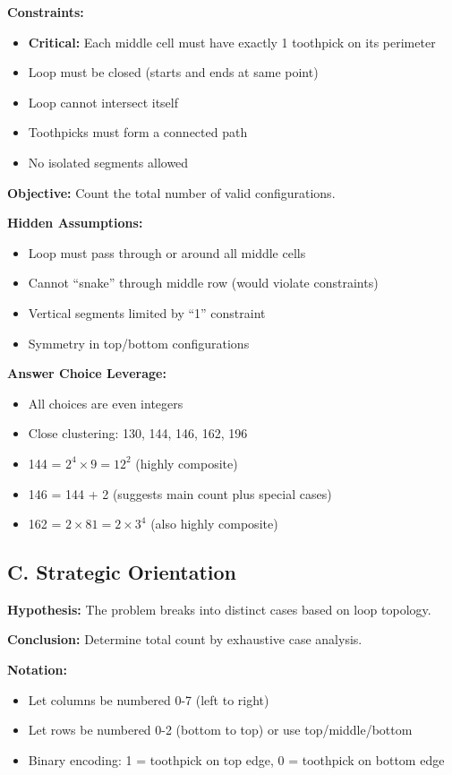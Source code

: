 \documentclass[12pt]{article}
\begin{document}
\begin{problemconfigbox}
\textbf{Constraints:}
\begin{itemize}
    \item \textbf{Critical:} Each middle cell must have exactly 1 toothpick on its perimeter
    \item Loop must be closed (starts and ends at same point)
    \item Loop cannot intersect itself
    \item Toothpicks must form a connected path
    \item No isolated segments allowed
\end{itemize}

\textbf{Objective:} Count the total number of valid configurations.

\textbf{Hidden Assumptions:}
\begin{itemize}
    \item Loop must pass through or around all middle cells
    \item Cannot ``snake'' through middle row (would violate constraints)
    \item Vertical segments limited by ``1'' constraint
    \item Symmetry in top/bottom configurations
\end{itemize}

\textbf{Answer Choice Leverage:}
\begin{itemize}
    \item All choices are even integers
    \item Close clustering: 130, 144, 146, 162, 196
    \item 144 = $2^4 \times 9 = 12^2$ (highly composite)
    \item 146 = 144 + 2 (suggests main count plus special cases)
    \item 162 = $2 \times 81 = 2 \times 3^4$ (also highly composite)
\end{itemize}

\subsection*{C. Strategic Orientation}

\textbf{Hypothesis:} The problem breaks into distinct cases based on loop topology.

\textbf{Conclusion:} Determine total count by exhaustive case analysis.

\textbf{Notation:}
\begin{itemize}
    \item Let columns be numbered 0-7 (left to right)
    \item Let rows be numbered 0-2 (bottom to top) or use top/middle/bottom
    \item Binary encoding: 1 = toothpick on top edge, 0 = toothpick on bottom edge
\end{itemize}


\end{problemconfigbox}
\end{document}
